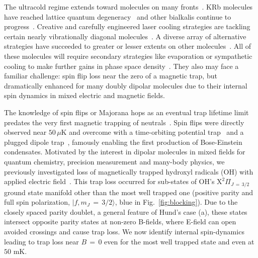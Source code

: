 \documentclass[%
 reprint,
 amsmath,amssymb,
 aps,
prl,
]{revtex4-1}
\begin{document}
The ultracold regime extends toward molecules on many fronts~\cite{Carr2009}. 
KRb molecules have reached lattice quantum degeneracy~\cite{Moses2015} and other bialkalis continue to progress~\cite{Takekoshi2014, Park2015,Guo2016,Liu2017}. 
Creative and carefully engineered laser cooling strategies are tackling certain nearly vibrationally diagonal molecules~\cite{Stuhl2008,Shuman2010,Hummon2013, Barry2014, Zhelyazkova2014, Steinecker2016, Hemmerling2016}. 
A diverse array of alternative strategies have succeeded to greater or lesser extents on other molecules~\cite{Doyle1998, Bethlem1999, Bochinski2003, Narevicius2008, Wiederkehr2012, Prehn2016,Liu2017a}. 
All of these molecules will require secondary strategies like evaporation or sympathetic cooling to make further gains in phase space density~\cite{Parazzoli2011, Stuhl2012evap, Quemener2016}. 
They also may face a familiar challenge: spin flip loss near the zero of a magnetic trap, but dramatically enhanced for many doubly dipolar molecules due to their internal spin dynamics in mixed electric and magnetic fields. 

The knowledge of spin flips or Majorana hops as an eventual trap lifetime limit predates the very first magnetic trapping of neutrals~\cite{Migdall1985}. 
Spin flips were directly observed near $50\,\mu\text{K}$ and overcome with a time-orbiting potential trap~\cite{Petrich1995} and a plugged dipole trap~\cite{Davis1995}, famously enabling the first production of Bose-Einstein condensates. 
Motivated by the interest in dipolar molecules in mixed fields for quantum chemistry, precision measurement and many-body physics, we previously investigated loss of magnetically trapped hydroxyl radicals (OH) with applied electric field~\cite{Stuhl2012uwave}. 
This trap loss occurred for sub-states of OH's $\mathrm{X}^2\Pi_{J\,{=}\,3/2}$ ground state manifold other than the most well trapped one (positive parity and full spin polarization, $|f,m_J\,{=}\,3/2\rangle$, blue in Fig.~\ref{fig:blocking}). 
Due to the closely spaced parity doublet, a general feature of Hund's case (a), these states intersect opposite parity states at non-zero B-fields, where E-field can open avoided crossings and cause trap loss.
We now identify internal spin-dynamics leading to trap loss near $B\,{=}\,0$ even for the most well trapped state and even at $50\text{ mK}$.
\end{document}
